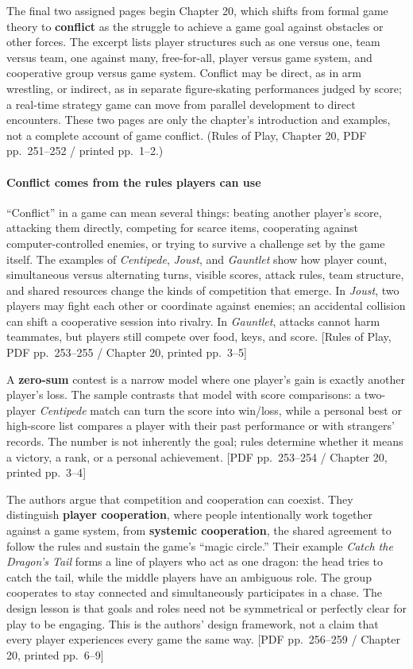 The final two assigned pages begin Chapter 20, which shifts from formal game theory to \textbf{conflict} as the struggle to achieve a game goal against obstacles or other forces. The excerpt lists player structures such as one versus one, team versus team, one against many, free-for-all, player versus game system, and cooperative group versus game system. Conflict may be direct, as in arm wrestling, or indirect, as in separate figure-skating performances judged by score; a real-time strategy game can move from parallel development to direct encounters. These two pages are only the chapter's introduction and examples, not a complete account of game conflict. (Rules of Play, Chapter 20, PDF pp.~251--252 / printed pp.~1--2.)

\paragraph{Conflict comes from the rules players can use}\label{05-engine-i-ch009-conflict-comes-from-the-rules-players-can-use}

``Conflict'' in a game can mean several things: beating another player's score, attacking them directly, competing for scarce items, cooperating against computer-controlled enemies, or trying to survive a challenge set by the game itself. The examples of \emph{Centipede}, \emph{Joust}, and \emph{Gauntlet} show how player count, simultaneous versus alternating turns, visible scores, attack rules, team structure, and shared resources change the kinds of competition that emerge. In \emph{Joust}, two players may fight each other or coordinate against enemies; an accidental collision can shift a cooperative session into rivalry. In \emph{Gauntlet}, attacks cannot harm teammates, but players still compete over food, keys, and score. {[}Rules of Play, PDF pp.~253--255 / Chapter 20, printed pp.~3--5{]}

A \textbf{zero-sum} contest is a narrow model where one player's gain is exactly another player's loss. The sample contrasts that model with score comparisons: a two-player \emph{Centipede} match can turn the score into win/loss, while a personal best or high-score list compares a player with their past performance or with strangers' records. The number is not inherently the goal; rules determine whether it means a victory, a rank, or a personal achievement. {[}PDF pp.~253--254 / Chapter 20, printed pp.~3--4{]}

The authors argue that competition and cooperation can coexist. They distinguish \textbf{player cooperation}, where people intentionally work together against a game system, from \textbf{systemic cooperation}, the shared agreement to follow the rules and sustain the game's ``magic circle.'' Their example \emph{Catch the Dragon's Tail} forms a line of players who act as one dragon: the head tries to catch the tail, while the middle players have an ambiguous role. The group cooperates to stay connected and simultaneously participates in a chase. The design lesson is that goals and roles need not be symmetrical or perfectly clear for play to be engaging. This is the authors' design framework, not a claim that every player experiences every game the same way. {[}PDF pp.~256--259 / Chapter 20, printed pp.~6--9{]}

